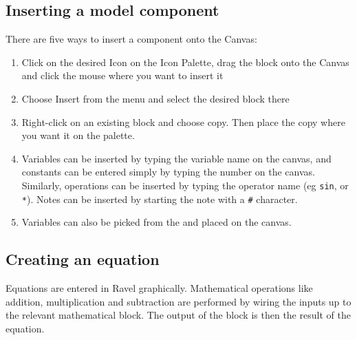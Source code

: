 \subsection{Inserting a model component}


There are five ways to insert a component onto the Canvas:
\begin{enumerate}
\item Click on the desired Icon on the Icon Palette, drag the block onto the Canvas and click the mouse where you want to insert it 

\begin{center}
\end{center}

\item Choose Insert from the menu and select the desired block there

  \begin{center}
  \end{center}
  \newpage
  
\item Right-click on an existing block and choose copy. Then place the copy where you want it on the palette. 

\begin{center}
\end{center}

\item Variables can be inserted by typing the variable name on the canvas, and constants can be entered simply by typing the number on the canvas. Similarly, operations can be inserted by typing the operator name (eg \verb+sin+, or \verb+*+). Notes can be inserted by starting the note with a \verb+#+ character.

\item Variables can also be picked from the  and placed on the canvas.
\end{enumerate}


\subsection{Creating an equation}

Equations are entered in Ravel graphically. Mathematical operations like addition, multiplication and subtraction are performed by wiring the inputs up to the relevant mathematical block. The output of the block is then the result of the equation. 

